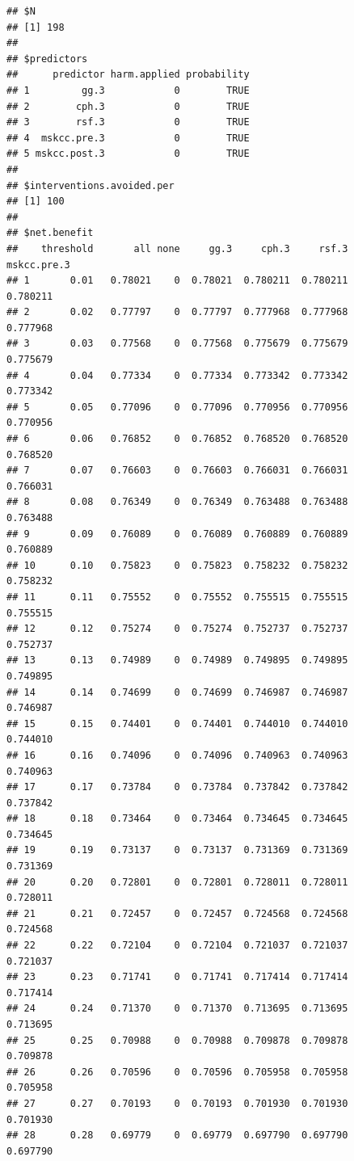 \documentclass{article}\usepackage[]{graphicx}\usepackage[]{color}
\makeatletter
\newenvironment{kframe}{%
 \def\at@end@of@kframe{}%
 \ifinner\ifhmode%
  \def\at@end@of@kframe{\end{minipage}}%
  \begin{minipage}{\columnwidth}%
 \fi\fi%
 \def\FrameCommand##1{\hskip\@totalleftmargin \hskip-\fboxsep
 \colorbox{shadecolor}{##1}\hskip-\fboxsep
     \hskip-\linewidth \hskip-\@totalleftmargin \hskip\columnwidth}%
 \MakeFramed {\advance\hsize-\width
   \@totalleftmargin\z@ \linewidth\hsize
   \@setminipage}}%
 {\par\unskip\endMakeFramed%
 \at@end@of@kframe}
\newenvironment{knitrout}{}{} %
\makeatother
\begin{document}
\begin{knitrout}
{}


\begin{kframe}\begin{verbatim}
## $N
## [1] 198
## 
## $predictors
##      predictor harm.applied probability
## 1         gg.3            0        TRUE
## 2        cph.3            0        TRUE
## 3        rsf.3            0        TRUE
## 4  mskcc.pre.3            0        TRUE
## 5 mskcc.post.3            0        TRUE
## 
## $interventions.avoided.per
## [1] 100
## 
## $net.benefit
##    threshold       all none     gg.3     cph.3     rsf.3 mskcc.pre.3
## 1       0.01   0.78021    0  0.78021  0.780211  0.780211    0.780211
## 2       0.02   0.77797    0  0.77797  0.777968  0.777968    0.777968
## 3       0.03   0.77568    0  0.77568  0.775679  0.775679    0.775679
## 4       0.04   0.77334    0  0.77334  0.773342  0.773342    0.773342
## 5       0.05   0.77096    0  0.77096  0.770956  0.770956    0.770956
## 6       0.06   0.76852    0  0.76852  0.768520  0.768520    0.768520
## 7       0.07   0.76603    0  0.76603  0.766031  0.766031    0.766031
## 8       0.08   0.76349    0  0.76349  0.763488  0.763488    0.763488
## 9       0.09   0.76089    0  0.76089  0.760889  0.760889    0.760889
## 10      0.10   0.75823    0  0.75823  0.758232  0.758232    0.758232
## 11      0.11   0.75552    0  0.75552  0.755515  0.755515    0.755515
## 12      0.12   0.75274    0  0.75274  0.752737  0.752737    0.752737
## 13      0.13   0.74989    0  0.74989  0.749895  0.749895    0.749895
## 14      0.14   0.74699    0  0.74699  0.746987  0.746987    0.746987
## 15      0.15   0.74401    0  0.74401  0.744010  0.744010    0.744010
## 16      0.16   0.74096    0  0.74096  0.740963  0.740963    0.740963
## 17      0.17   0.73784    0  0.73784  0.737842  0.737842    0.737842
## 18      0.18   0.73464    0  0.73464  0.734645  0.734645    0.734645
## 19      0.19   0.73137    0  0.73137  0.731369  0.731369    0.731369
## 20      0.20   0.72801    0  0.72801  0.728011  0.728011    0.728011
## 21      0.21   0.72457    0  0.72457  0.724568  0.724568    0.724568
## 22      0.22   0.72104    0  0.72104  0.721037  0.721037    0.721037
## 23      0.23   0.71741    0  0.71741  0.717414  0.717414    0.717414
## 24      0.24   0.71370    0  0.71370  0.713695  0.713695    0.713695
## 25      0.25   0.70988    0  0.70988  0.709878  0.709878    0.709878
## 26      0.26   0.70596    0  0.70596  0.705958  0.705958    0.705958
## 27      0.27   0.70193    0  0.70193  0.701930  0.701930    0.701930
## 28      0.28   0.69779    0  0.69779  0.697790  0.697790    0.697790

\end{verbatim}
\end{kframe}
\end{knitrout}
\end{document}
